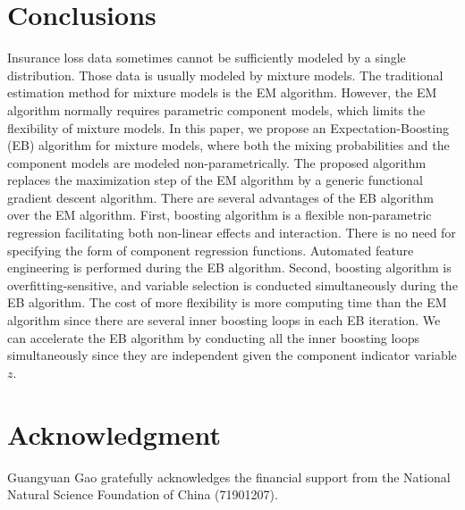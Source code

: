 \documentclass[11pt]{article}
\numberwithin{equation}{section}
\begin{document}
\section{Conclusions}\label{sec:conclusions}
Insurance loss data sometimes cannot be sufficiently modeled by a single distribution.
Those data is usually modeled by mixture models.
The traditional estimation method for mixture models is the EM algorithm.
However, the EM algorithm normally requires parametric component models, which limits the flexibility of mixture models.
In this paper, we propose an Expectation-Boosting (EB) algorithm for mixture models, where both the mixing probabilities and the component models are modeled non-parametrically. 
The proposed algorithm replaces the maximization step of the EM algorithm by a generic functional gradient descent algorithm.
There are several advantages of the EB algorithm over the EM algorithm. 
First, boosting algorithm is a flexible non-parametric regression facilitating both {non-linear effects and interaction}.  
There is no need for specifying the form of component regression functions.
Automated feature engineering is performed during the EB algorithm.
Second, boosting algorithm is {overfitting-sensitive}, and {variable selection} is conducted simultaneously during the EB algorithm.
The cost of more flexibility is more computing time than the EM algorithm since there are several inner boosting loops in each EB iteration.
We can accelerate the EB algorithm by conducting all the inner boosting loops simultaneously since they are independent given the component indicator variable $z$.

	\section*{Acknowledgment}
Guangyuan Gao gratefully acknowledges the financial support from the National Natural Science Foundation of China (71901207). 



\end{document}
